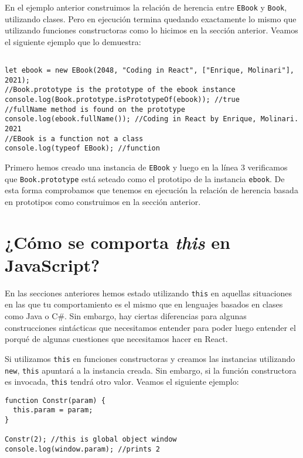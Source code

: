 \documentclass[a4paper, oneside, titlepage, 12pt]{paper}
\begin{document}
En el ejemplo anterior construimos la relación de herencia entre \texttt{EBook} y \texttt{Book}, utilizando clases. Pero en ejecución termina quedando exactamente lo mismo que utilizando funciones constructoras como lo hicimos en la sección anterior. Veamos el siguiente ejemplo que lo demuestra:

\begin{verbatim}

let ebook = new EBook(2048, "Coding in React", ["Enrique, Molinari"], 2021);
//Book.prototype is the prototype of the ebook instance
console.log(Book.prototype.isPrototypeOf(ebook)); //true
//fullName method is found on the prototype
console.log(ebook.fullName()); //Coding in React by Enrique, Molinari. 2021
//EBook is a function not a class
console.log(typeof EBook); //function
\end{verbatim}

Primero hemos creado una instancia de \texttt{EBook} y luego en la línea 3 verificamos que \texttt{Book.prototype} está seteado como el prototipo de la instancia \texttt{ebook}. De esta forma comprobamos que tenemos en ejecución la relación de herencia basada en prototipos como construimos en la sección anterior.

\section{¿Cómo se comporta \textit{this} en JavaScript?} \label{meaning_of_this}

En las secciones anteriores hemos estado utilizando \texttt{this} en aquellas situaciones en las que tu comportamiento es el mismo que en lenguajes basados en clases como Java o C\#. Sin embargo, hay ciertas diferencias para algunas construcciones sintácticas que necesitamos entender para poder luego entender el porqué de algunas cuestiones que necesitamos hacer en React.
\newline

Si utilizamos \texttt{this} en funciones constructoras y creamos las instancias utilizando \texttt{new}, \texttt{this} apuntará a la instancia creada. Sin embargo, si la función constructora es invocada, \texttt{this} tendrá otro valor. Veamos el siguiente ejemplo:

\begin{verbatim}
function Constr(param) {
  this.param = param;
}

Constr(2); //this is global object window
console.log(window.param); //prints 2
\end{verbatim}
\end{document}
